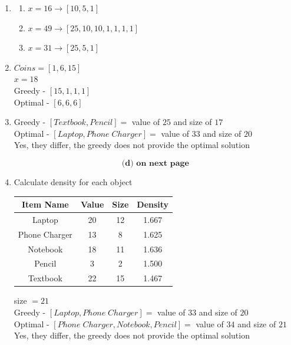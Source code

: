 \documentclass[9pt]{article}
\begin{document}
\begin{enumerate}

\item 
\begin{enumerate}
    \item $x=16 \rightarrow [10, 5, 1]$
    \item $x=49 \rightarrow [25, 10, 10, 1, 1, 1, 1]$
    \item $x=31 \rightarrow [25, 5, 1]$
\end{enumerate}

\item $Coins = [1, 6, 15]$\\
      $x = 18$\\
      Greedy - $[15,1,1,1]$\\
      Optimal - $[6,6,6]$

\item Greedy - $[Textbook, Pencil] = $ value of $25$ and size of $17$\\
      Optimal - $[Laptop, Phone\; Charger] = $ value of $33$ and size of $20$\\
      Yes, they differ, the greedy does not provide the optimal solution

      $$\textbf{(d) on next page}$$
      \newpage
\item 
    Calculate density for each object\\
    \begin{center}
    \begin{tabular}{c|c|c|c}
        Item Name & Value & Size & Density\\ \hline
        Laptop & 20 & 12 & 1.667\\ 
        Phone Charger & 13 & 8 & 1.625\\
        Notebook & 18 & 11 & 1.636\\
        Pencil & 3 & 2 & 1.500\\
        Textbook & 22 & 15 & 1.467
        \end{tabular}
    \end{center}
        size $ = 21$\\
        Greedy - $[Laptop, Phone\; Charger] = $ value of $33$ and size of $20$\\
        Optimal - $[Phone\; Charger, Notebook, Pencil] = $ value of $34$ and size of $21$\\
        Yes, they differ, the greedy does not provide the optimal solution
\end{enumerate}

\fi
\end{document}

